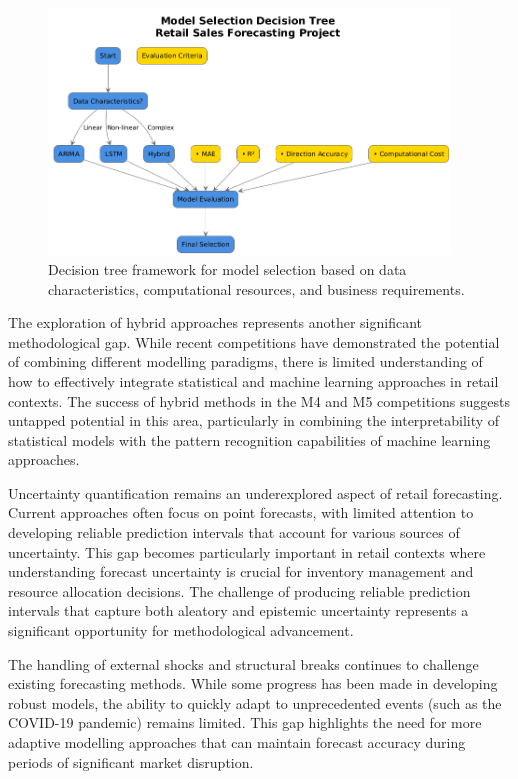 \documentclass[12pt,a4paper]{report}
\begin{document}
\begin{figure}[htbp]
    \centering
    \includegraphics[width=0.95\textwidth]{model_selection_decision_tree.png}
    \caption{Decision tree framework for model selection based on data characteristics, computational resources, and business requirements.}
    \label{fig:model_selection_tree}
\end{figure}

The exploration of hybrid approaches represents another significant methodological gap. While recent competitions have demonstrated the potential of combining different modelling paradigms, there is limited understanding of how to effectively integrate statistical and machine learning approaches in retail contexts. The success of hybrid methods in the M4 and M5 competitions suggests untapped potential in this area, particularly in combining the interpretability of statistical models with the pattern recognition capabilities of machine learning approaches.

Uncertainty quantification remains an underexplored aspect of retail forecasting. Current approaches often focus on point forecasts, with limited attention to developing reliable prediction intervals that account for various sources of uncertainty. This gap becomes particularly important in retail contexts where understanding forecast uncertainty is crucial for inventory management and resource allocation decisions. The challenge of producing reliable prediction intervals that capture both aleatory and epistemic uncertainty represents a significant opportunity for methodological advancement.

The handling of external shocks and structural breaks continues to challenge existing forecasting methods. While some progress has been made in developing robust models, the ability to quickly adapt to unprecedented events (such as the COVID-19 pandemic) remains limited. This gap highlights the need for more adaptive modelling approaches that can maintain forecast accuracy during periods of significant market disruption.
\end{document}
